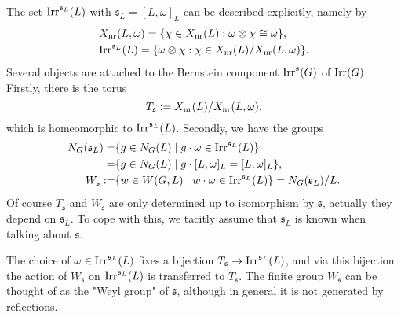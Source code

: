 \documentclass[11pt]{amsart}
\theoremstyle{definition}
\begin{document}
The set ${{\rm Irr}}^{{{\mathfrak s}}_L}(L)$ with ${{\mathfrak s}}_L = [L,\omega]_L$ can be described 
explicitly, namely by \label{i:28} \label{i:47} \label{i:81}
\begin{align}
& X_{{\rm nr}} (L,\omega) = \{ \chi \in X_{{\rm nr}} (L) : \omega \otimes \chi \cong \omega \} , \\
& {{\rm Irr}}^{{{\mathfrak s}}_L} (L) = \{ \omega \otimes \chi : \chi \in X_{{\rm nr}} (L) / X_{{\rm nr}} (L,\omega) \} .
\end{align}
Several objects are attached to the Bernstein component ${{\rm Irr}}^{{\mathfrak s}} (G)$ of
${{\rm Irr}} (G)$ \cite{BeDe}. Firstly, there is the torus \label{i:58}                              
\[  
T_{{\mathfrak s}} := X_{{\rm nr}} (L) / X_{{\rm nr}} (L,\omega) ,
\]
which is homeomorphic to ${{\rm Irr}}^{{{\mathfrak s}}_L}(L)$. 
Secondly, we have the groups \label{i:37} \label{i:66}
\begin{align*}
N_G ({{\mathfrak s}}_L) = & \{ g \in N_G (L) \mid g \cdot \omega \in {{\rm Irr}}^{{{\mathfrak s}}_L}(L) \} \\
= & \{ g \in N_G (L) \mid g \cdot [L,\omega]_L = [L,\omega]_L \} , \\
W_{{\mathfrak s}} := & \{ w \in W(G,L) \mid w \cdot \omega \in {{\rm Irr}}^{{{\mathfrak s}}_L}(L) \} = N_G ({{\mathfrak s}}_L) / L .
\end{align*}
Of course $T_{{\mathfrak s}}$ and $W_{{\mathfrak s}}$ are only determined up to isomorphism by ${{\mathfrak s}}$, actually
they depend on ${{\mathfrak s}}_L$. To cope with this, we tacitly assume that ${{\mathfrak s}}_L$ is known
when talking about ${{\mathfrak s}}$.

The choice of $\omega \in {{\rm Irr}}^{{{\mathfrak s}}_L}(L)$ fixes a bijection $T_{{\mathfrak s}} \to {{\rm Irr}}^{{{\mathfrak s}}_L}(L)$,
and via this bijection the action of $W_{{\mathfrak s}}$ on ${{\rm Irr}}^{{{\mathfrak s}}_L}(L)$ is transferred to
$T_{{\mathfrak s}}$. The finite group $W_{{\mathfrak s}}$ can be thought of as the "Weyl group" of ${{\mathfrak s}}$, 
although in general it is not generated by reflections. 
\end{document}
